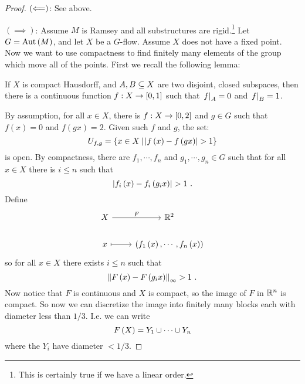 \documentclass{amsart}
\begin{document}
\begin{proof}
$\left( \Longleftarrow \right)$: See above.

$\left( \implies \right)$: Assume $M$ is Ramsey and all substructures are
rigid.\footnote{This is certainly true if we have a linear order.} Let $G = \operatorname{Aut}\left(
M \right)$, and let $X$ be a $G$-flow. Assume $X$ does not have a fixed point.
Now we want to use compactness to find finitely many elements of the group which move all
of the points. First we recall the following lemma:
\begin{lem}[Urysohn]
If $X$ is compact Hausdorff, and $A,B\subseteq X$ are two disjoint, closed subspaces, then
there is a continuous function $f: X\rightarrow \left[ 0,1 \right]$ such that $\left.f \right\vert_{A} =
0$ and $\left.f \right\vert_{B} = 1$. 
\end{lem}

By assumption, for all $x\in X$, there is $f: X\rightarrow \left[ 0,2 \right]$ and $g\in G$
such that $f\left( x \right) = 0$ and $f\left( gx \right) = 2$. 
Given such $f$ and $g$, the set:
\begin{equation}
U_{f,g} = \left\{ x\in X \, \middle\vert \, \left| f\left( x \right)  -f\left( gx \right) \right| > 1 \right\}
\end{equation}
is open. By compactness, there are $f_1 , \cdots , f_n$ and $g_1 , \cdots , g_n\in G$
such that for all $x\in X$ there is $i\leq n$ such that
\begin{equation}
\left| f_i\left( x \right) - f_i\left( g_i x \right) \right|  > 1 \ .
\end{equation}
Define
\begin{equation}
\begin{tikzcd}
X\arrow{r}{F}& \RR^2\\
x\arrow[mapsto]{r}&\left( f_1\left( x \right) , \cdots , f_n\left( x \right) \right)
\end{tikzcd}
\end{equation}
so for all $x\in X$ there exists $i\leq n$ such that
\begin{equation}
\left\lVert F\left( x \right) - F\left( g_i x \right) \right\rVert_\infty > 1 \ .
\end{equation}
Now notice that $F$ is continuous and $X$ is compact, so the image of $F$ in $\mathbb{R}^n$ is
compact. So now we can discretize the image into finitely many blocks each with diameter
less than $1/3$. I.e. we can write
\begin{equation}
F\left( X \right) = Y_1 \cup \cdots \cup Y_n
\end{equation}
where the $Y_i$ have diameter $< 1/3$. 


\end{proof}
\end{document}
